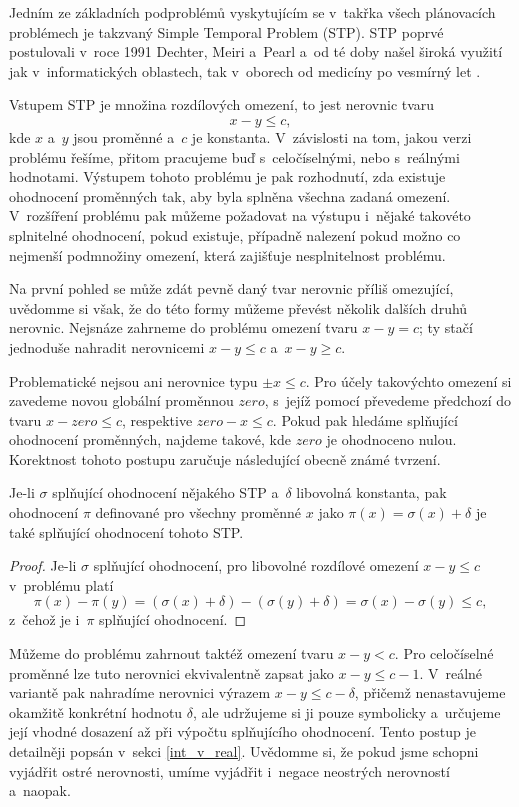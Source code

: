Jedním ze základních podproblémů vyskytujícím se v~takřka všech plánovacích problémech je takzvaný Simple Temporal Problem (STP). STP poprvé postulovali v~roce 1991 Dechter, Meiri a~Pearl \cite{Dechter91} a~od té doby našel široká využití jak v~informatických oblastech, tak v~oborech od medicíny \cite{Anselma06} po vesmírný let \cite{Fukunaga97}.

Vstupem STP je množina rozdílových omezení, to jest nerovnic tvaru $$x - y \leq c,$$ kde $x$ a~$y$ jsou proměnné a~$c$ je konstanta. V~závislosti na tom, jakou verzi problému řešíme, přitom pracujeme buď s~celočíselnými, nebo s~reálnými hodnotami. Výstupem tohoto problému je pak rozhodnutí, zda existuje ohodnocení proměnných tak, aby byla splněna všechna zadaná omezení. V~rozšíření problému pak můžeme požadovat na výstupu i~nějaké takovéto splnitelné ohodnocení, pokud existuje, případně nalezení pokud možno co nejmenší podmnožiny omezení, která zajišťuje nesplnitelnost problému.

Na první pohled se může zdát pevně daný tvar nerovnic příliš omezující, uvědomme si však, že do této formy můžeme převést několik dalších druhů nerovnic. Nejsnáze zahrneme do problému omezení tvaru $x - y = c$; ty stačí jednoduše nahradit nerovnicemi $x - y \leq c$ a~$x - y \geq c$.

Problematické nejsou ani nerovnice typu $\pm x \leq c$. Pro účely takovýchto omezení si zavedeme novou globální proměnnou $zero$, s~jejíž pomocí převedeme předchozí do tvaru $x - zero \leq c$, respektive $zero - x \leq c$. Pokud pak hledáme splňující ohodnocení proměnných, najdeme takové, kde $zero$ je ohodnoceno nulou. Korektnost tohoto postupu zaručuje následující obecně známé tvrzení.

\begin{tvrz}
	Je-li $\sigma$ splňující ohodnocení nějakého STP a~$\delta$ libovolná konstanta, pak ohodnocení $\pi$ definované pro všechny proměnné $x$ jako $\pi(x) = \sigma(x) + \delta$ je také splňující ohodnocení tohoto STP.
\end{tvrz}
\begin{proof}
	Je-li $\sigma$ splňující ohodnocení, pro libovolné rozdílové omezení $x-y \leq c$ v~problému platí $$\pi(x) - \pi(y) = (\sigma(x) + \delta) - (\sigma(y) + \delta) = \sigma(x) - \sigma(y) \leq c,$$ z~čehož je i~$\pi$ splňující ohodnocení.
\end{proof}

Můžeme do problému zahrnout taktéž omezení tvaru $x - y < c$. Pro celočíselné proměnné lze tuto nerovnici ekvivalentně zapsat jako $x - y \leq c-1$. V~reálné variantě pak nahradíme nerovnici výrazem $x - y \leq c - \delta$, přičemž nenastavujeme okamžitě konkrétní hodnotu $\delta$, ale udržujeme si ji pouze symbolicky a~určujeme její vhodné dosazení až při výpočtu splňujícího ohodnocení. Tento postup je detailněji popsán v~sekci \ref{int_v_real}. Uvědomme si, že pokud jsme schopni vyjádřit ostré nerovnosti, umíme vyjádřit i~negace neostrých nerovností a~naopak.

